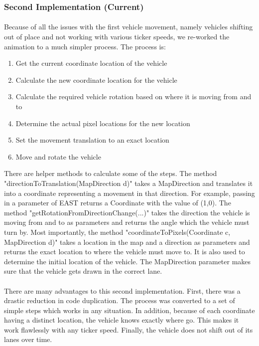 \documentclass[a4paper,11pt,titlepage]{article}
\begin{document}
\subsubsection{Second Implementation (Current)}
\paragraph{}
Because of all the issues with the first vehicle movement, namely vehicles shifting out of place and not working with various ticker speeds, we re-worked the animation to a much simpler process. The process is:
\begin{enumerate}\itemsep1pt \parskip0pt 
\item Get the current coordinate location of the vehicle
\item Calculate the new coordinate location for the vehicle
\item Calculate the required vehicle rotation based on where it is moving from and to
\item Determine the actual pixel locations for the new location
\item Set the movement translation to an exact location
\item Move and rotate the vehicle
\end{enumerate}
There are helper methods to calculate some of the steps. The method "directionToTranslation(MapDirection d)" takes a MapDirection and translates it into a coordinate representing a movement in that direction. For example, passing in a parameter of EAST returns a Coordinate with the value of (1,0). The method "getRotationFromDirectionChange(...)" takes the direction the vehicle is moving from and to as parameters and returns the angle which the vehicle must turn by. Most importantly, the method "coordinateToPixels(Coordinate c, MapDirection d)" takes a location in the map and a direction as parameters and returns the exact location to where the vehicle must move to. It is also used to determine the initial location of the vehicle. The MapDirection parameter makes sure that the vehicle gets drawn in the correct lane.

\paragraph{}
There are many advantages to this second implementation. First, there was a drastic reduction in code duplication. The process was converted to a set of simple steps which works in any situation. In addition, because of each coordinate having a distinct location, the vehicle knows exactly where go. This makes it work flawlessly with any ticker speed. Finally, the vehicle does not shift out of its lanes over time. 
\end{document}
